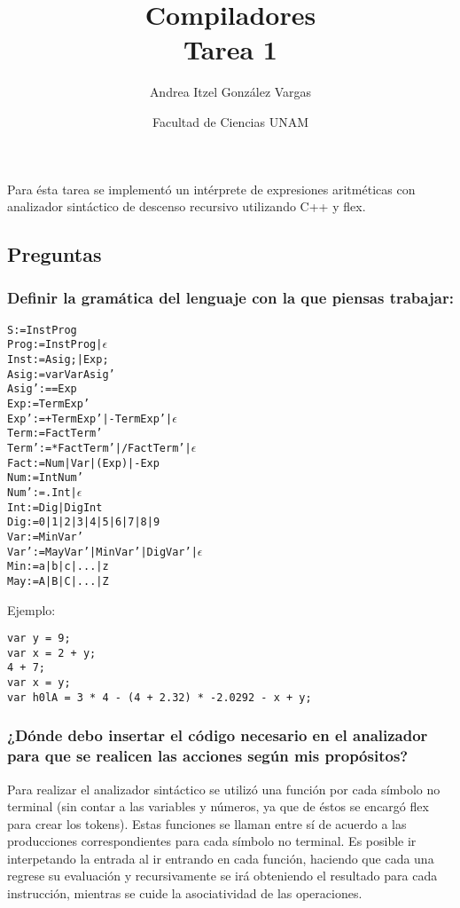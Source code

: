 \documentclass[12pt]{article}
\title{Compiladores \\ Tarea 1}
\author{Andrea Itzel González Vargas}
\date{Facultad de Ciencias UNAM}
\begin{document}
\maketitle

Para ésta tarea se implementó un intérprete de expresiones aritméticas con analizador sintáctico de descenso recursivo utilizando \textsf{C++} y \textsf{flex}.

\subsection{Preguntas}

\subsubsection{Definir la gramática del lenguaje con la que piensas trabajar:}
\begin{alltt}
S     := InstProg
Prog  := InstProg | \(\epsilon\)
Inst  := Asig; | Exp;
Asig  := var VarAsig'
Asig' := =Exp
Exp   := TermExp'
Exp'  := +TermExp' | -TermExp' | \(\epsilon\)
Term  := FactTerm'
Term' := *FactTerm' | /FactTerm' | \(\epsilon\)
Fact  := Num | Var | (Exp) | -Exp
Num   := IntNum'
Num'  := .Int | \(\epsilon\)
Int   := Dig | DigInt
Dig   := 0 | 1 | 2 | 3 | 4 | 5 | 6 | 7 | 8 | 9
Var   := MinVar'
Var'  := MayVar' | MinVar' | DigVar' | \(\epsilon\)
Min   := a | b | c | ... | z
May   := A | B | C | ... | Z
\end{alltt}

Ejemplo:
\begin{verbatim}
var y = 9;
var x = 2 + y;
4 + 7;
var x = y;
var h0lA = 3 * 4 - (4 + 2.32) * -2.0292 - x + y;
\end{verbatim}

\subsubsection*{¿Dónde debo insertar el código necesario en el analizador para que se realicen las acciones según mis propósitos?}

Para realizar el analizador sintáctico se utilizó una función por cada símbolo no terminal (sin contar a las variables y números, ya que de éstos se encargó \textsf{flex} para crear los tokens). Estas funciones se llaman entre sí de acuerdo a las producciones correspondientes para cada símbolo no terminal. Es posible ir interpetando la entrada al ir entrando en cada función, haciendo que cada una regrese su evaluación y recursivamente se irá obteniendo el resultado para cada instrucción, mientras se cuide la asociatividad de las operaciones. \\
\end{document}
